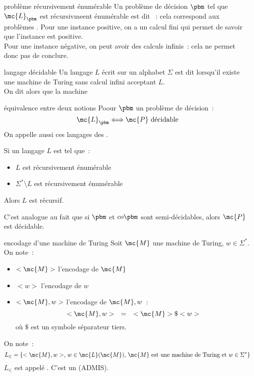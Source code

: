 \begin{definition}{}{problème récursivement énumérable}
    Un problème de décision $\pbm$ tel que $\mc{L}_\pbm$ est récursivmeent énumérable est dit ~: cela correspond aux problèmes . Pour une instance positive, on a un calcul fini qui permet de savoir que l'instance est positive.\\
    Pour une instance négative, on peut avoir des calculs infinis~: cela ne permet donc pas de conclure.
\end{definition}

\begin{definition}{}{langage décidable}
    Un langage $L$ écrit sur un alphabet $\Sigma$ est dit  lorsqu'il existe une machine de Turing sans calcul infini acceptant $L$.\\
    On dit alors que la machine 
\end{definition}

\begin{proposition}{}{équivalence entre deux notions}
    Poour $\pbm$ un problème de décision~:
    $$\mc{L}_\pbm \Longleftrightarrow \mc{P} \text{ décidable}$$
    On appelle aussi ces langages des .
\end{proposition}

\begin{proposition}{}{}
    Si un langage $L$ est tel que~:
    \begin{itemize}
        \item $L$ est récursivement énumérable
        \item $\Sigma^* \setminus L$ est récursivement énumérable
    \end{itemize}
    Alors $L$ est récursif.
\end{proposition}

\begin{remarque}{}{}
    C'est analogue au fait que si $\pbm$ et $co\pbm$ sont semi-décidables, alors $\mc{P}$ est décidable.
\end{remarque}

\begin{definition}{}{encodage d'une machine de Turing}
    Soit $\mc{M}$ une machine de Turing, $w \in \Sigma^*$. On note~:
    \begin{itemize}
        \item $<\mc{M}>$ l'encodage de $\mc{M}$
        \item $<w>$ l'encodage de $w$
        \item $<\mc{M}, w>$ l'encodage de $\mc{M}, w$~:
        $$<\mc{M},w> \quad = \quad <\mc{M}>\$<w>$$
        où $\$$ est un symbole séparateur tiers.
    \end{itemize}
    On note~:
    $$L_\in = \{<\mc{M},w>,\, w \in \mc{L}(\mc{M}),\, \mc{M} \text{ est une machine de Turing et }  w \in \Sigma^*\}$$
    $L_\in$ est appelé . C'est un  (ADMIS).
\end{definition}

